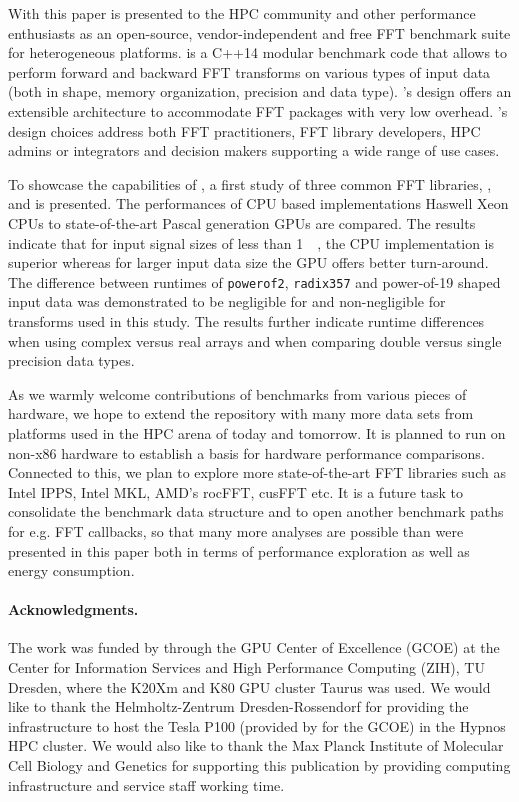 
With this paper \gearshifft{} is presented to the HPC community and other performance enthusiasts as an open-source, vendor-independent and free FFT benchmark suite for heterogeneous platforms. \gearshifft{} is a C++14 modular benchmark code that allows to perform forward and backward FFT transforms on various types of input data (both in shape, memory organization, precision and data type). \gearshifft{}'s design offers an extensible architecture to accommodate FFT packages with very low overhead. \gearshifft{}'s design choices address both FFT practitioners, FFT library developers, HPC admins or integrators and decision makers supporting a wide range of use cases. 

To showcase the capabilities of \gearshifft{}, a first study of three common FFT libraries, \fftw{}, \clfft{} and \cufft{} is presented. The performances of CPU based implementations Haswell Xeon CPUs to state-of-the-art Pascal generation \nvidia{} GPUs are compared. The results indicate that for input signal sizes of less than \SI{1}{\mebi\byte}, the CPU implementation is superior whereas for larger input data size the GPU offers better turn-around. The difference between runtimes of \texttt{powerof2}, \texttt{radix357} and power-of-19 shaped input data was demonstrated to be negligible for \fftw{} and non-negligible for \cufft{} transforms used in this study. The results further indicate runtime differences when using complex versus real arrays and when comparing double versus single precision data types.     

As we warmly welcome contributions of benchmarks from various pieces of hardware, we hope to extend the \gearshifft{} repository with many more data sets from platforms used in the HPC arena of today and tomorrow. It is planned to run \gearshifft{} on non-x86 hardware to establish a basis for hardware performance comparisons. Connected to this, we plan to explore more state-of-the-art FFT libraries such as Intel IPPS, Intel MKL, AMD's rocFFT, cusFFT etc. It is a future task to consolidate the benchmark data structure and to open another benchmark paths for e.g. FFT callbacks, so that many more analyses are possible than were presented in this paper both in terms of performance exploration as well as energy consumption.

\paragraph{Acknowledgments.} The work was funded by \nvidia{} through the GPU Center of Excellence (GCOE) at the Center for Information Services and High Performance Computing (ZIH), TU Dresden, where the K20Xm and K80 GPU cluster Taurus was used. We would like to thank the Helmholtz-Zentrum Dresden-Rossendorf for providing the infrastructure to host the \nvidia{} Tesla P100 (provided by \nvidia{} for the GCOE) in the Hypnos HPC cluster. We would also like to thank the Max Planck Institute of Molecular Cell Biology and Genetics for supporting this publication by providing computing infrastructure and service staff working time.
